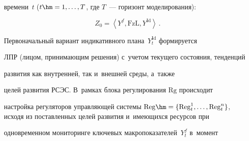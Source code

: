 времени~$t$ ($t\hm=1, \ldots , T$, где $T$~--- горизонт моделирования):


  \begin{equation*}


  Z_0=\left\langle Y^f, \mathrm{FzL}, Y^{\mathrm{Id}}\right\rangle\,.




  \end{equation*}


  


    


  


























  


  Первоначальный вариант индикативного плана~$Y_t^{\mathrm{Id}}$ формируется 


ЛПР (лицом, принимающим решения) с~учетом текущего со\-сто\-яния, тенденций 


развития как внут\-рен\-ней, так и~внеш\-ней среды, а~так\-же  


целей развития РСЭС. В~рамках блока регулирования $\mathrm{Rg}$ происходит 


настройка регуляторов управ\-ля\-ющей сис\-те\-мы $\mathrm{Reg}\hm= \{ 


\mathrm{Reg}_t^1, \ldots , 


\mathrm{Reg}_t^n\}$, исходя из по\-став\-лен\-ных целей развития и~име\-ющих\-ся ресурсов при 


одновременном мониторинге клю\-че\-вых макропоказателей~$Y_t^f$ в~момент 


